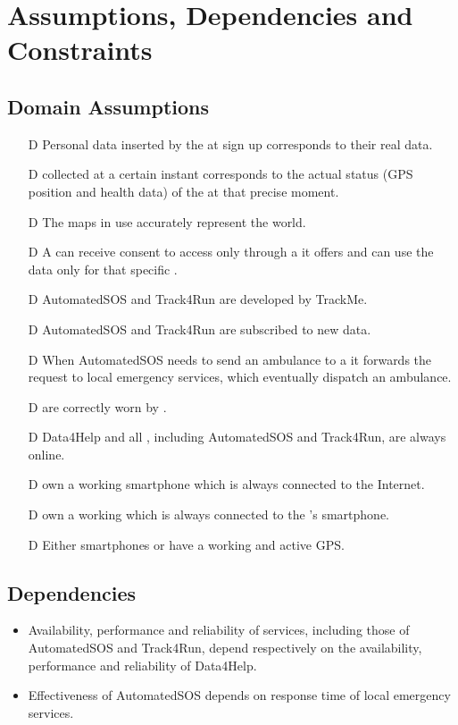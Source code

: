 \documentclass[../../rasd.tex]{subfiles}
\begin{document}
\section{Assumptions, Dependencies and Constraints}
	\subsection{Domain Assumptions}
	 	\begin{itemize}
		 	\item[D\subs{1}]Personal data inserted by the  at sign up corresponds to their real data.
			\item[D\subs{2}] collected at a certain instant corresponds to the actual status (GPS position and health data) of the  at that precise moment.				
			\item[D\subs{3}]The maps in use accurately represent the world.
			\item[D\subs{4}]A  can receive consent to  access only through a  it offers and can use the data only for that specific .
			\item[D\subs{5}]AutomatedSOS and Track4Run are  developed by TrackMe.
			\item[D\subs{6}]AutomatedSOS and Track4Run are subscribed to new data.
			\item[D\subs{7}]When AutomatedSOS needs to send an ambulance to a  it forwards the request to local emergency services, which eventually dispatch an ambulance.
			\item[D\subs{8}] are correctly worn by .
			\item[D\subs{9}]Data4Help and all , including AutomatedSOS and Track4Run, are always online.
			\item[D\subs{10}] own a working smartphone which is always connected to the Internet.
			\item[D\subs{11}] own a working  which is always connected to the 's smartphone.
			\item[D\subs{12}]Either smartphones or  have a working and active GPS.
		\end{itemize}	
	\subsection{Dependencies}
		\begin{itemize}
			\item Availability, performance and reliability of services, including those of AutomatedSOS and Track4Run, depend respectively on the availability, performance and reliability of Data4Help.
			\item Effectiveness of AutomatedSOS depends on response time of local emergency services.
		\end{itemize}
\end{document}
